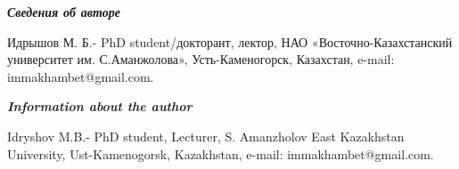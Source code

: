 \begin{authorinfo}
\emph{{\bfseries Сведения об авторе}}

Идрышов М. Б.- PhD student/докторант, лектор, НАО
«Восточно-Казахстанский университет им. С.Аманжолова», Усть-Каменогорск,
Казахстан, e-mail: immakhambet@gmail.com.

\emph{{\bfseries Information about the author}}

Idryshov M.B.- PhD student, Lecturer, S. Amanzholov East Kazakhstan
University, Ust-Kamenogorsk, Kazakhstan, e-mail: immakhambet@gmail.com.
\end{authorinfo}
